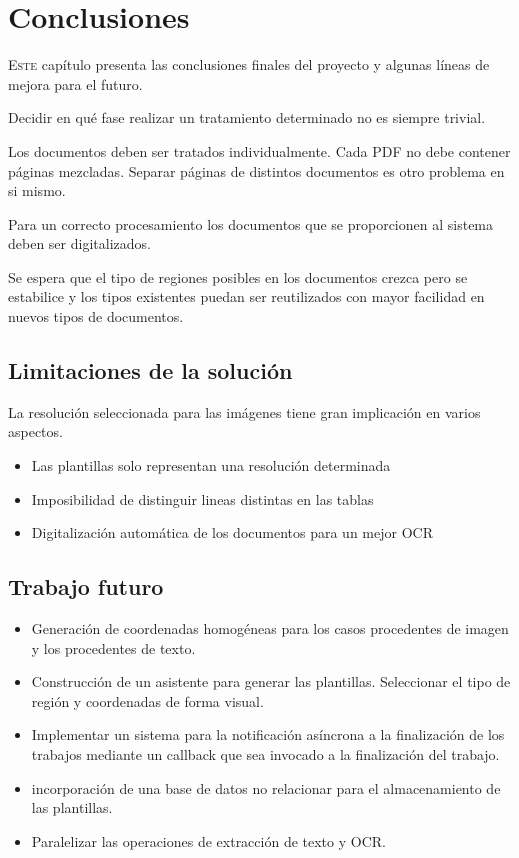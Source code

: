 
\chapter{Conclusiones}
\label{chap:conclusiones}

\lettrine{E}{ste} capítulo presenta las conclusiones finales del proyecto y algunas líneas de mejora para el futuro.

Decidir en qué fase realizar un tratamiento determinado no es siempre trivial.

Los documentos deben ser tratados individualmente. Cada PDF no debe contener páginas mezcladas. Separar páginas de distintos documentos es otro problema en si mismo.

Para un correcto procesamiento los documentos que se proporcionen 
al sistema deben ser digitalizados.

Se espera que el tipo de regiones posibles en los documentos crezca pero se estabilice y los tipos existentes puedan ser reutilizados con mayor facilidad en nuevos tipos de documentos.

\section{Limitaciones de la solución}
La resolución seleccionada para las imágenes tiene gran implicación en varios aspectos.
\begin{itemize}
    \item Las plantillas solo representan una resolución determinada
    \item Imposibilidad de distinguir lineas distintas en las tablas
    \item Digitalización automática de los documentos para un mejor OCR
\end{itemize}

\section{Trabajo futuro}

\begin{itemize}
    \item Generación de coordenadas homogéneas para los casos procedentes de imagen y los procedentes de texto.
    \item Construcción de un asistente para generar las plantillas. Seleccionar el tipo de región y coordenadas de forma visual.
    \item Implementar un sistema para la notificación asíncrona a la finalización de los trabajos mediante un callback que sea invocado a la finalización del trabajo.
    \item incorporación de una base de datos no relacionar para el almacenamiento de las plantillas.
    \item Paralelizar las operaciones de extracción de texto y OCR.
\end{itemize}

